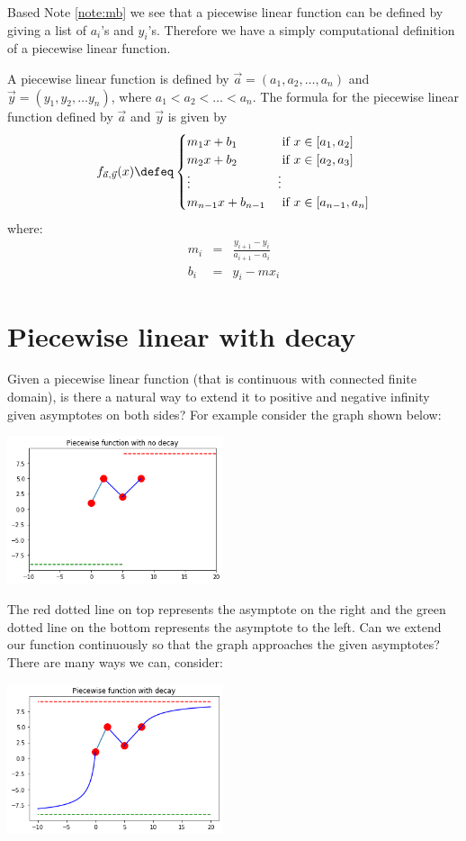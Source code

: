 \documentclass[10pt]{article}
\begin{document}
Based Note \ref{note:mb} we see that a piecewise linear function can be defined
by giving a list of $a_i$'s and $y_i$'s.  Therefore we have a simply computational
definition of a piecewise linear function.
\begin{definition}[Computational]
\label{def:computational}
A piecewise linear function is defined by $\vec{a}=(a_1,a_2,\ldots,a_n)$ and
$\vec{y}=(y_1, y_2, \ldots y_n)$, where $a_1<a_2<\ldots <a_n$.  The formula
for the piecewise linear function defined by $\vec{a}$ and $\vec{y}$ is given by
$$
f_{\vec{a},\vec{y}}(x) \defeq
\begin{cases}
m_1 x + b_1 & \hbox{ if } x \in [a_1, a_2] \\
m_2 x + b_2 & \hbox{ if } x \in [a_2, a_3] \\
\vdots & \vdots \\
m_{n-1} x + b_{n-1} & \hbox{ if } x \in [a_{n-1}, a_n]
\end{cases}
$$
where:
\begin{eqnarray*}
m_i &=& \frac{y_{i+1}-y_i}{a_{i+1}-a_i} \\
b_i &=& y_i - m x_i
\end{eqnarray*}
\end{definition}
\section{Piecewise linear with decay}
Given a piecewise linear function (that is continuous with connected finite
domain), is there a natural way to extend it to positive and negative infinity
given asymptotes on both sides?  For example consider the graph shown below:

\includegraphics[width=2.5in]{pw_nodecay}

The red dotted line on top represents the asymptote on the right and the green
dotted line on the bottom represents the asymptote to the left.  Can we extend
our function continuously so that the graph approaches the given asymptotes?
There are many ways we can, consider:

\includegraphics[width=2.5in]{pw_decay1a}
\end{document}
